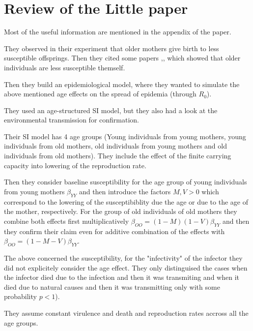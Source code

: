 \documentclass[10pt]{article}         %
\begin{document}
\section{Review of the Little paper}
Most of the useful information are mentioned in the appendix of the paper.\newline

They observed in their experiment that older mothers give birth to less susceptible offsprings. Then they cited some papers \cite{Izhar_Ben_Ami},\cite{Garbutt}, \cite{Alizon}  which showed that older individuals are less susceptible themself.\newline

Then they build an epidemiological model, where they wanted to simulate the above mentioned age effects on the spread of epidemia (through $R_0$).\newline

They used an age-structured SI model, but they also had a look at the environmental transmission for confirmation.\newline

Their SI model has 4 age groups (Young individuals from young mothers, young individuals from old mothers, old individuals from young mothers and  old individuals from old mothers). They include the effect of the finite carrying capacity into lowering of the reproduction rate.\newline

Then they consider baseline susceptibility for the age group of young individuals from young mothers $\beta_{YY}$ and then introduce the factors $M,V >0$ which correspond to the lowering of the susceptibiblity due the age or due to the age of the mother, respectively. For the group of old individuals of old mothers they combine both effects first multiplicatively $\beta_{OO}=(1-M)(1-V)\beta_{YY}$ and then they confirm their claim even for additive combination of the effects with $\beta_{OO}=(1-M-V)\beta_{YY}$.\newline

The above concerned the susceptibility, for the "infectivity" of the infector they did not explicitely consider the age effect. They only distinguised the cases when the infector died due to the infection and then it was transmiting and when it died due to natural causes and then it was transmitting only with some probability $p<1$).\newline

They assume constant virulence and death and reproduction rates accross all the age groups.\newline
\end{document}
